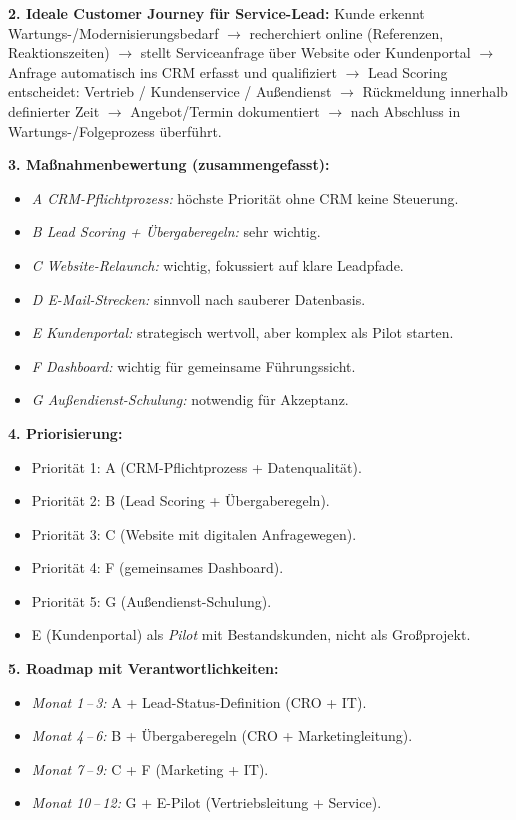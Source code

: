 \documentclass[11pt,a4paper,oneside]{article}
\begin{document}
\begin{loesungbox}
\textbf{2. Ideale Customer Journey für Service-Lead:}
Kunde erkennt Wartungs-/Modernisierungsbedarf $\rightarrow$ recherchiert online (Referenzen, Reaktionszeiten) $\rightarrow$ stellt Serviceanfrage über Website oder Kundenportal $\rightarrow$ Anfrage automatisch ins CRM erfasst und qualifiziert $\rightarrow$ Lead Scoring entscheidet: Vertrieb / Kundenservice / Außendienst $\rightarrow$ Rückmeldung innerhalb definierter Zeit $\rightarrow$ Angebot/Termin dokumentiert $\rightarrow$ nach Abschluss in Wartungs-/Folgeprozess überführt.

\textbf{3. Maßnahmenbewertung (zusammengefasst):}
\begin{itemize}
  \item \emph{A CRM-Pflichtprozess:} höchste Priorität \textendash{} ohne CRM keine Steuerung.
  \item \emph{B Lead Scoring + Übergaberegeln:} sehr wichtig.
  \item \emph{C Website-Relaunch:} wichtig, fokussiert auf klare Leadpfade.
  \item \emph{D E-Mail-Strecken:} sinnvoll nach sauberer Datenbasis.
  \item \emph{E Kundenportal:} strategisch wertvoll, aber komplex \textendash{} als Pilot starten.
  \item \emph{F Dashboard:} wichtig für gemeinsame Führungssicht.
  \item \emph{G Außendienst-Schulung:} notwendig für Akzeptanz.
\end{itemize}

\textbf{4. Priorisierung:}
\begin{itemize}
  \item Priorität 1: A (CRM-Pflichtprozess + Datenqualität).
  \item Priorität 2: B (Lead Scoring + Übergaberegeln).
  \item Priorität 3: C (Website mit digitalen Anfragewegen).
  \item Priorität 4: F (gemeinsames Dashboard).
  \item Priorität 5: G (Außendienst-Schulung).
  \item E (Kundenportal) als \emph{Pilot} mit Bestandskunden, nicht als Großprojekt.
\end{itemize}

\textbf{5. Roadmap mit Verantwortlichkeiten:}
\begin{itemize}
  \item \emph{Monat 1\,--\,3:} A + Lead-Status-Definition (CRO + IT).
  \item \emph{Monat 4\,--\,6:} B + Übergaberegeln (CRO + Marketingleitung).
  \item \emph{Monat 7\,--\,9:} C + F (Marketing + IT).
  \item \emph{Monat 10\,--\,12:} G + E-Pilot (Vertriebsleitung + Service).
\end{itemize}


\end{loesungbox}
\end{document}
